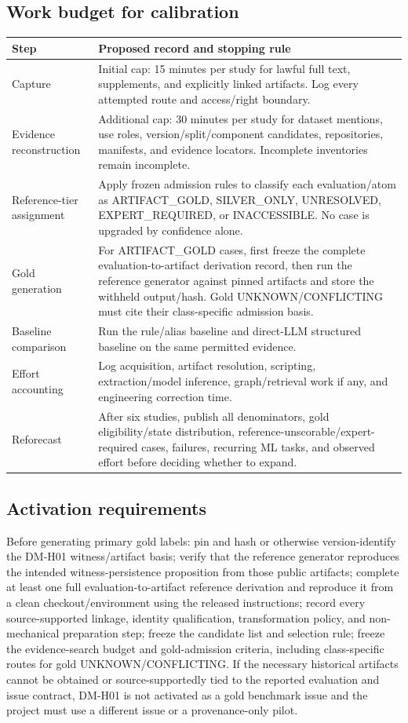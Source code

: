 \documentclass[11pt,a4paper]{article}
\newcommand{\status}[1]{\textsf{\small #1}}
\begin{document}
\subsection{Work budget for calibration}
\begin{tabularx}{\linewidth}{@{}L{29mm}Y@{}}
\toprule
\textbf{Step} & \textbf{Proposed record and stopping rule}\\ \midrule
Capture & Initial cap: 15 minutes per study for lawful full text, supplements, and explicitly linked artifacts. Log every attempted route and access/right boundary.\\
Evidence reconstruction & Additional cap: 30 minutes per study for dataset mentions, use roles, version/split/component candidates, repositories, manifests, and evidence locators. Incomplete inventories remain incomplete.\\
Reference-tier assignment & Apply frozen admission rules to classify each evaluation/atom as ARTIFACT\_GOLD, SILVER\_ONLY, UNRESOLVED, EXPERT\_REQUIRED, or INACCESSIBLE. No case is upgraded by confidence alone.\\
Gold generation & For ARTIFACT\_GOLD cases, first freeze the complete evaluation-to-artifact derivation record, then run the reference generator against pinned artifacts and store the withheld output/hash. Gold UNKNOWN/CONFLICTING must cite their class-specific admission basis.\\
Baseline comparison & Run the rule/alias baseline and direct-LLM structured baseline on the same permitted evidence.\\
Effort accounting & Log acquisition, artifact resolution, scripting, extraction/model inference, graph/retrieval work if any, and engineering correction time.\\
Reforecast & After six studies, publish all denominators, gold eligibility/state distribution, reference-unscorable/expert-required cases, failures, recurring ML tasks, and observed effort before deciding whether to expand.\\
\bottomrule
\end{tabularx}

\subsection{Activation requirements}
Before generating primary gold labels: pin and hash or otherwise version-identify the DM-H01 witness/artifact basis; verify that the reference generator reproduces the intended witness-persistence proposition from those public artifacts; complete at least one full evaluation-to-artifact reference derivation and reproduce it from a clean checkout/environment using the released instructions; record every source-supported linkage, identity qualification, transformation policy, and non-mechanical preparation step; freeze the candidate list and selection rule; freeze the evidence-search budget and gold-admission criteria, including class-specific routes for gold \status{UNKNOWN}/\status{CONFLICTING}. If the necessary historical artifacts cannot be obtained or source-supportedly tied to the reported evaluation and issue contract, DM-H01 is not activated as a gold benchmark issue and the project must use a different issue or a provenance-only pilot.
\end{document}
